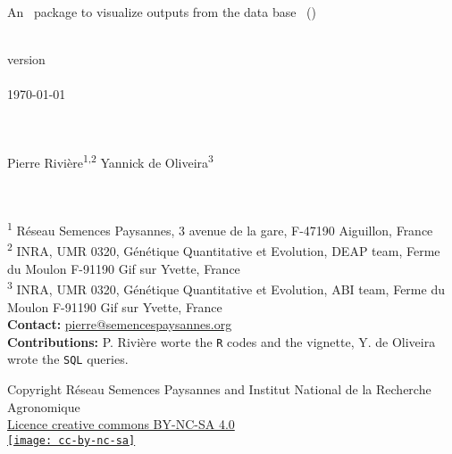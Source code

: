 \begin{center}
\Huge{\pack } \\
\Large{An \R~package to visualize outputs from the data base \BDfull~(\BD)}

~\\

version \versionnumber \\

~\\
\today

~\\~\\

Pierre Rivi\`ere\textsuperscript{1,2} \hspace{1cm} Yannick de Oliveira\textsuperscript{3} \\
~\\~\\ 
\end{center}


\noindent\textsuperscript{1} R\'eseau Semences Paysannes, 3 avenue de la gare, F-47190 Aiguillon, France \\ 
\textsuperscript{2} INRA, UMR 0320, Génétique Quantitative et Evolution, DEAP team, Ferme du Moulon F-91190 Gif sur Yvette, France \\
\textsuperscript{3} INRA, UMR 0320, Génétique Quantitative et Evolution, ABI team, Ferme du Moulon F-91190 Gif sur Yvette, France \\
\textbf{Contact:} \href{mailto:pierre@semencespaysannes.org}{pierre@semencespaysannes.org} \\
\textbf{Contributions:} 
P. Rivière worte the \texttt{R} codes and the vignette,
Y. de Oliveira wrote the \texttt{SQL} queries.

\vfill

\begin{center}
Copyright Réseau Semences Paysannes and Institut National de la Recherche Agronomique \\
\href{http://creativecommons.org/licenses/by-nc-sa/4.0/}{Licence creative commons BY-NC-SA 4.0} \\
\vspace{.25cm}
\href{http://creativecommons.org/licenses/by-nc-sa/4.0/}{\texttt{[image: cc-by-nc-sa]}}
\end{center}

\vfill

